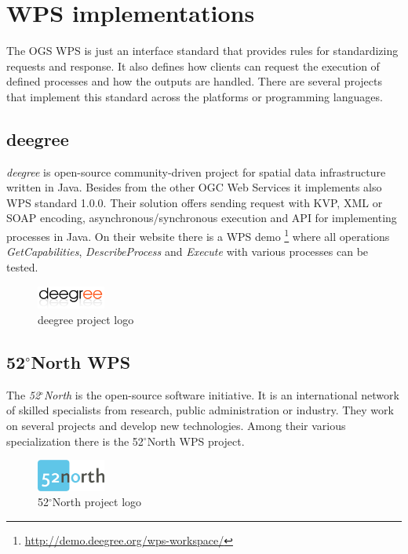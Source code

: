 \newpage
\section{WPS implementations}
The OGS WPS is just an interface standard that provides rules for standardizing requests and response. It also defines how clients can request the execution of defined processes and how the outputs are handled. There are several projects that implement this standard across the platforms or programming languages.

\subsection{deegree}
\textit{deegree} is open-source community-driven project for spatial data infrastructure written in Java. Besides from the other OGC Web Services it implements also WPS standard 1.0.0. Their solution offers sending request with KVP, XML or SOAP encoding, asynchronous/synchronous execution and API for implementing processes in Java. On their website there is a WPS demo
\footnote{\url{http://demo.deegree.org/wps-workspace/}} where all operations \textit{GetCapabilities}, \textit{DescribeProcess} and \textit{Execute} with various processes can be tested.

\bigskip
\begin{figure}[h!]
\centering
\includegraphics[width=0.2\textwidth]{img/deegree.png}
\caption{deegree project logo}
\label{fig:deegree}
\end{figure}

\subsection{52$^{\circ}$North WPS}
The \textit{52$^{\circ}$North} is the open-source software initiative. It is an international network of skilled specialists from research,
public administration or industry. They work on several projects and develop new technologies. Among their various specialization there is 
the 52$^{\circ}$North WPS project.

\bigskip
\begin{figure}[h!]
\centering
\includegraphics[width=0.2\textwidth]{img/Intro_52north.png}
\caption{52$^{\circ}$North project logo}
\label{fig:Intro_52north}
\end{figure}

